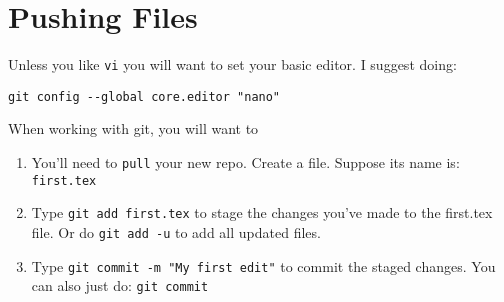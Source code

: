 \documentclass{ximera}
\begin{document}
\section{Pushing Files}

Unless you like \verb|vi| you will want to set your basic editor. I
suggest doing:

\begin{verbatim}
git config --global core.editor "nano"
\end{verbatim}

When working with git, you will want to
  \begin{enumerate}
\item You'll need to \verb!pull! your new repo. Create a file. Suppose its name is:
  \verb|first.tex|
\item Type \verb!git add first.tex! to stage the changes you've made
  to the first.tex file. Or do \verb|git add -u| to add all updated
  files.
\item Type \verb!git commit -m "My first edit"! to commit the staged changes. You can also just do: \verb|git commit|
  \end{enumerate}
\end{document}
